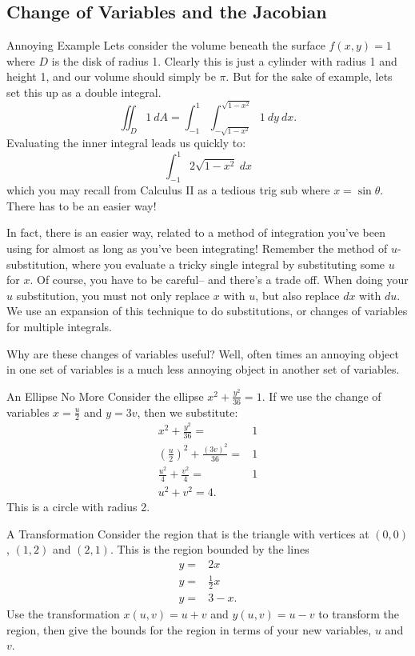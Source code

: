 
\subsection{Change of Variables and the Jacobian}
\begin{example}{Annoying Example}
Lets consider the volume beneath the surface $f(x,y)=1$ where $D$ is the disk of radius 1. Clearly this is just a cylinder with radius 1 and height 1, and our volume should simply be $\pi$. But for the sake of example, lets set this up as a double integral.
$$\iint_D 1 \ dA=\int_{-1}^{1}\int_{-\sqrt{1-x^2}}^{\sqrt{1-x^2}}1\ dy\ dx. $$
Evaluating the inner integral leads us quickly to:
$$\int_{-1}^{1}2\sqrt{1-x^2}\ dx $$ which you may recall from Calculus II as a tedious trig sub where $x=\sin\theta$. There has to be an easier way!
\end{example}

In fact, there is an easier way, related to a method of integration you've been using for almost as long as you've been integrating! Remember the method of $u$-substitution, where you evaluate a tricky single integral by substituting some $u$ for $x$. Of course, you have to be careful-- and there's a trade off. When doing your $u$ substitution, you must not only replace $x$ with $u$, but also replace $dx$ with $du$. We use an expansion of this technique to do substitutions, or changes of variables for multiple integrals.

Why are these changes of variables useful? Well, often times an annoying object in one set of variables is a much less annoying object in another set of variables.

\begin{example}{An Ellipse No More}
Consider the ellipse $x^2+\frac{y^2}{36}=1.$ If we use the change of variables $x=\frac{u}{2}$ and $y=3v$, then we substitute:
\begin{align*}
x^2+\frac{y^2}{36}=&1\\
\left(\frac{u}{2}\right)^2+\frac{(3v)^2}{36}=&1\\
\frac{u^2}{4}+\frac{v^2}{4}=&1\\
u^2+v^2=4.
\end{align*}
This is a circle with radius 2.
\end{example}

\begin{exercise}{A Transformation}
Consider the region that is the triangle with vertices at $(0,0)$, $(1,2)$ and $(2,1)$. This is the region bounded by the lines \begin{align*}
y=&2x\\
y=&\frac{1}{2}x\\
y=&3-x.
\end{align*}
Use the transformation $x(u,v)=u+v$ and $y(u,v)=u-v$ to transform the region, then give the bounds for the region in terms of your new variables, $u$ and $v$.
\end{exercise}

